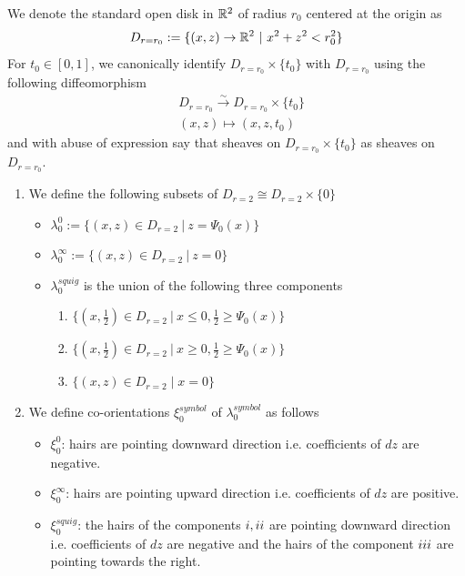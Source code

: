 \begin{definition}
We denote the standard open disk in $\mathbb{R}^2$ of radius $r_0$ centered at the origin as 
\[
D_{r=r_0} := \{(x,z)\rightarrow \mathbb{R}^2 ~|~ x^2+z^2 < r_0^2\}
\]
For $t_0 \in [0,1]$, we canonically identify $D_{r=r_0}\times \{t_0\}$ with $D_{r=r_0}$ using the following diffeomorphism
\begin{align*}
& D_{r=r_0} \xrightarrow{\sim} D_{r=r_0} \times \{t_0\} \\
& (x,z) \mapsto (x,z,t_0)
\end{align*}
and with abuse of expression say that sheaves on $D_{r=r_0}\times \{t_0\}$ as sheaves on $D_{r=r_0}$.
\end{definition}

\begin{definition}
\begin{enumerate}
\item We define the following subsets of $D_{r=2} \cong D_{r=2}\times \{0\}$
\begin{itemize}
\item $\lambda_0^0 := \{(x,z) \in D_{r=2} ~|~ z = \Psi_0(x)\}$

\item $\lambda_0^\infty := \{(x,z) \in D_{r=2} ~|~ z = 0 \}$

\item $\lambda_0^{squig}$ is the union of the following three components
\begin{enumerate}[label=(\roman*)]
\item $\{(x,\frac{1}{2}) \in D_{r=2} ~|~ x \leq 0, \frac{1}{2} \geq \Psi_0(x) \}$

\item $\{(x,\frac{1}{2}) \in D_{r=2} ~|~ x \geq 0,\frac{1}{2} \geq \Psi_0(x) \}$

\item $\{(x,z)\in D_{r=2} \mid x=0\}$
\end{enumerate}
\end{itemize}

\item We define co-orientations $\xi_0^{symbol}$ of $\lambda_0^{symbol}$ as follows
\begin{itemize}
\item $\xi_0^0$: hairs are pointing downward direction i.e. coefficients of $dz$ are negative.

\item $\xi_0^\infty$: hairs are pointing upward direction i.e. coefficients of $dz$ are positive.

\item $\xi_0^{squig}$: the hairs of the components $\Rn{1},\Rn{2}$ are pointing downward direction i.e. coefficients of $dz$ are negative and the hairs of the component $\Rn{3}$ are pointing towards the right.
\end{itemize}
\end{enumerate}
\end{definition}

